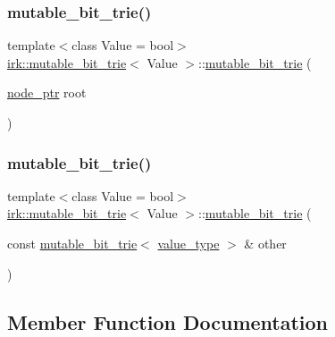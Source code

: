 \subsubsection{\texorpdfstring{mutable\+\_\+bit\+\_\+trie()}{mutable\_bit\_trie()}\hspace{0.1cm}{\footnotesize\ttfamily [2/3]}}
{\footnotesize\ttfamily template$<$class Value = bool$>$ \\
\mbox{\hyperlink{classirk_1_1mutable__bit__trie}{irk\+::mutable\+\_\+bit\+\_\+trie}}$<$ Value $>$\+::\mbox{\hyperlink{classirk_1_1mutable__bit__trie}{mutable\+\_\+bit\+\_\+trie}} (\begin{DoxyParamCaption}\item[{\mbox{\hyperlink{classirk_1_1mutable__bit__trie_abd23179ac4f02a981d4f47b4c0652287}{node\+\_\+ptr}}}]{root }\end{DoxyParamCaption})\hspace{0.3cm}{\ttfamily [inline]}}

\mbox{\label{classirk_1_1mutable__bit__trie_a64b9dd3b47cc74e653843cdf0f87db3b}} 
\subsubsection{\texorpdfstring{mutable\+\_\+bit\+\_\+trie()}{mutable\_bit\_trie()}\hspace{0.1cm}{\footnotesize\ttfamily [3/3]}}
{\footnotesize\ttfamily template$<$class Value = bool$>$ \\
\mbox{\hyperlink{classirk_1_1mutable__bit__trie}{irk\+::mutable\+\_\+bit\+\_\+trie}}$<$ Value $>$\+::\mbox{\hyperlink{classirk_1_1mutable__bit__trie}{mutable\+\_\+bit\+\_\+trie}} (\begin{DoxyParamCaption}\item[{const \mbox{\hyperlink{classirk_1_1mutable__bit__trie}{mutable\+\_\+bit\+\_\+trie}}$<$ \mbox{\hyperlink{classirk_1_1mutable__bit__trie_a398f85c4065b746e6ab10842981a9bf4}{value\+\_\+type}} $>$ \&}]{other }\end{DoxyParamCaption})\hspace{0.3cm}{\ttfamily [inline]}}



\subsection{Member Function Documentation}
\mbox{\label{classirk_1_1mutable__bit__trie_ab45e17c9d8b88f14654d52e27c092c30}} 
